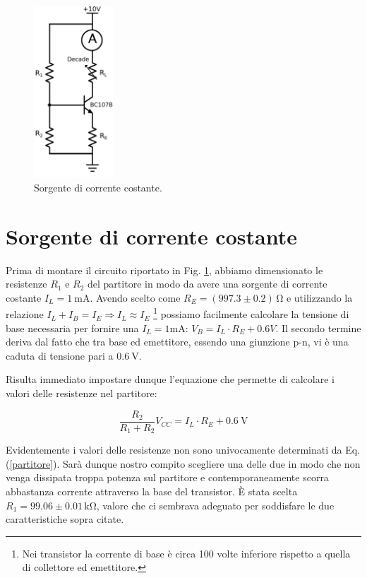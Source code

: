 \begin{figure}
	\includegraphics[width=30mm]{cc1.pdf}
	\caption{Sorgente di corrente costante.}
	\label{fig:cc1}
\end{figure}

\section{Sorgente di corrente costante}
Prima di montare il circuito riportato in Fig. \ref{fig:cc1}, abbiamo dimensionato le resistenze $R_1$ e $R_2$ del partitore in modo da avere una sorgente di corrente costante $I_L=\SI{1}{\milli\ampere}$.
Avendo scelto come $R_E=(997.3 \pm 0.2)\,\si{\ohm}$ e utilizzando la relazione $I_L+I_B=I_E \Rightarrow I_L \approx I_E$ \footnote{Nei transistor la corrente di base è circa 100 volte inferiore rispetto a quella di collettore ed emettitore.} possiamo facilmente calcolare la tensione di base necessaria per fornire una $I_L=1\si{\milli\ampere}$: $V_B=I_L \cdot R_E + 0.6V$.
Il secondo termine deriva dal fatto che tra base ed emettitore, essendo una giunzione p-n, vi è una caduta di tensione pari a $\SI{0.6}{\volt}$.

Risulta immediato impostare dunque l'equazione che permette di calcolare i valori delle resistenze nel partitore:

\begin{equation}
\frac{R_2}{R_1+R_2} V_{CC}=I_L \cdot R_E + \SI{0.6}{\volt}
\label{partitore}
\end{equation}

Evidentemente i valori delle resistenze non sono univocamente determinati da Eq. (\ref{partitore}).
Sarà dunque nostro compito scegliere una delle due in modo che non venga dissipata troppa potenza sul partitore e contemporaneamente scorra abbastanza corrente attraverso la base del transistor.
È stata scelta $R_1=99.06 \pm 0.01 \,\si{\kilo\ohm}$, valore che ci sembrava adeguato per soddisfare le due caratteristiche sopra citate.

